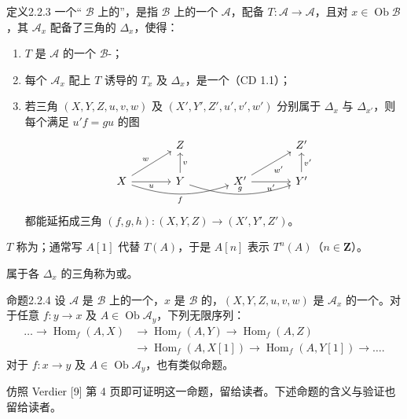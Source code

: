 \begin{SGAresult}{定义}{2.2.3}
一个“ $\mathcal B$ 上的”，是指 $\mathcal B$ 上的一个 $\mathcal A$，配备 $T:\mathcal A\to\mathcal A$，且对 $x\in\operatorname{Ob}\mathcal B$，其 $\mathcal A_x$ 配备了三角的 $\Delta_x$，使得：
\begin{enumerate}
\item[(i)] $T$ 是 $\mathcal A$ 的一个 $\mathcal B$-；
\item[(ii)] 每个 $\mathcal A_x$ 配上 $T$ 诱导的 $T_x$ 及 $\Delta_x$，是一个（CD 1.1）；
\item[(iii)] 若三角 $(X,Y,Z,u,v,w)$ 及 $(X',Y',Z',u',v',w')$ 分别属于 $\Delta_x$ 与 $\Delta_{x'}$，则每个满足 $u'f=gu$ 的图
\[
\begin{tikzcd}[column sep=large]
&Z&&Z'\\
X\arrow[ur,"w"]\arrow[r,"u"']\arrow[rr,bend right=18,"f"']&Y\arrow[u,"v"']\arrow[rr,bend right=18,"g"]&X'\arrow[ur,"w'"']\arrow[r,"u'"']&Y'\arrow[u,"v'"']
\end{tikzcd}
\]
都能延拓成三角 $(f,g,h):(X,Y,Z)\to(X',Y',Z')$。
\end{enumerate}
\end{SGAresult}
$T$ 称为；通常写 $A[1]$ 代替 $T(A)$，于是 $A[n]$ 表示 $T^n(A)$（$n\in\mathbf Z$）。

属于各 $\Delta_x$ 的三角称为或。

\begin{SGAresult}{命题}{2.2.4}
设 $\mathcal A$ 是 $\mathcal B$ 上的一个，$x$ 是 $\mathcal B$ 的，$(X,Y,Z,u,v,w)$ 是 $\mathcal A_x$ 的一个。对于任意 $f:y\to x$ 及 $A\in\operatorname{Ob}\mathcal A_y$，下列无限序列：
\[
\begin{aligned}
\dots\longrightarrow\operatorname{Hom}_f(A,X)&\longrightarrow\operatorname{Hom}_f(A,Y)\longrightarrow\operatorname{Hom}_f(A,Z)\\
&\longrightarrow\operatorname{Hom}_f(A,X[1])\longrightarrow\operatorname{Hom}_f(A,Y[1])\longrightarrow\dots.
\end{aligned}
\]
对于 $f:x\to y$ 及 $A\in\operatorname{Ob}\mathcal A_y$，也有类似命题。
\end{SGAresult}
仿照 Verdier [9] 第 4 页即可证明这一命题，留给读者。下述命题的含义与验证也留给读者。

